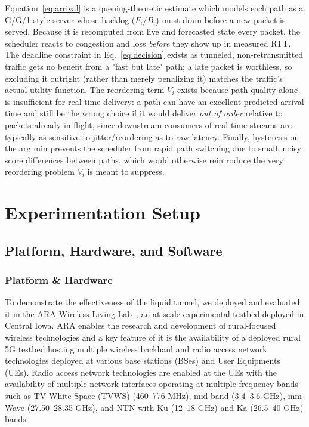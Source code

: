 \documentclass[sigconf,nonacm]{acmart}
\begin{document}
Equation~\eqref{eq:arrival} is a queuing-theoretic estimate which models each path as a G/G/1-style server whose backlog ($F_i/B_i$) must drain before a new packet is served. Because it is recomputed from live and forecasted state every packet, the scheduler reacts to congestion and loss \emph{before} they show up in measured RTT. The deadline constraint in Eq.~\eqref{eq:decision} exists as tunneled, non-retransmitted traffic gets no benefit from a "fast but late" path; a late packet is worthless, so excluding it outright (rather than merely penalizing it) matches the traffic's actual utility function. The reordering term $V_i$ exists because path quality alone is insufficient for real-time delivery: a path can have an excellent predicted arrival time and still be the wrong choice if it would deliver \emph{out of order} relative to packets already in flight, since downstream consumers of real-time streams are typically as sensitive to jitter/reordering as to raw latency. Finally, hysteresis on the arg min prevents the scheduler from rapid path switching due to small, noisy score differences between paths, which would otherwise reintroduce the very reordering problem $V_i$ is meant to suppress.

\section{Experimentation Setup}
\label{sec:experimentation}


\subsection{Platform, Hardware, and Software}
\subsubsection{Platform \& Hardware}
To demonstrate the effectiveness of the liquid tunnel, we deployed and evaluated it in the ARA Wireless Living Lab~\cite{islam_design_2024}, an at-scale experimental testbed deployed in Central Iowa. ARA enables the research and development of rural-focused wireless technologies and a key feature of it is the availability of a deployed rural 5G testbed hosting multiple wireless backhaul and radio access network technologies deployed at various base stations (BSes) and User Equipments (UEs). Radio access network technologies are enabled at the UEs with the availability of multiple network interfaces operating at multiple frequency bands such as TV White Space (TVWS) (460--776 MHz), mid-band (3.4--3.6 GHz), mm-Wave (27.50--28.35 GHz), and NTN with Ku (12--18 GHz) and Ka (26.5--40 GHz) bands. 
\end{document}
